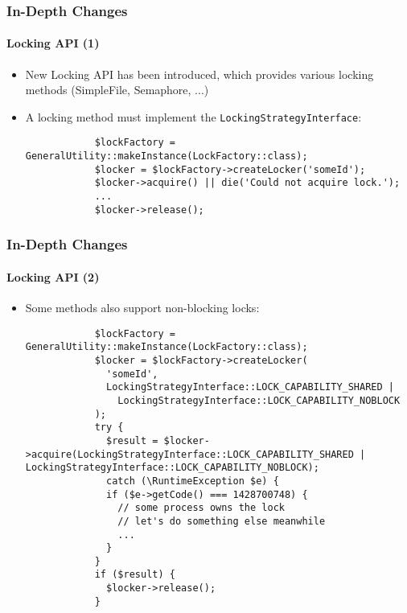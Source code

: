 \begin{frame}[fragile]
	\frametitle{In-Depth Changes}
	\framesubtitle{Locking API (1)}

	\begin{itemize}

		\item New Locking API has been introduced, which provides various locking methods (SimpleFile, Semaphore, ...)
		\item A locking method must implement the \small\texttt{LockingStrategyInterface}\normalsize:
		\begin{lstlisting}
			$lockFactory = GeneralUtility::makeInstance(LockFactory::class);
			$locker = $lockFactory->createLocker('someId');
			$locker->acquire() || die('Could not acquire lock.');
			...
			$locker->release();
		\end{lstlisting}

	\end{itemize}

\end{frame}

\begin{frame}[fragile]
	\frametitle{In-Depth Changes}
	\framesubtitle{Locking API (2)}

	\lstset{basicstyle=\tiny\ttfamily}

	\begin{itemize}

		\item Some methods also support non-blocking locks:

		\begin{lstlisting}
			$lockFactory = GeneralUtility::makeInstance(LockFactory::class);
			$locker = $lockFactory->createLocker(
			  'someId',
			  LockingStrategyInterface::LOCK_CAPABILITY_SHARED |
			    LockingStrategyInterface::LOCK_CAPABILITY_NOBLOCK
			);
			try {
			  $result = $locker->acquire(LockingStrategyInterface::LOCK_CAPABILITY_SHARED | LockingStrategyInterface::LOCK_CAPABILITY_NOBLOCK);
			  catch (\RuntimeException $e) {
			  if ($e->getCode() === 1428700748) {
			    // some process owns the lock
			    // let's do something else meanwhile
			    ...
			  }
			}
			if ($result) {
			  $locker->release();
			}
		\end{lstlisting}

	\end{itemize}

\end{frame}

